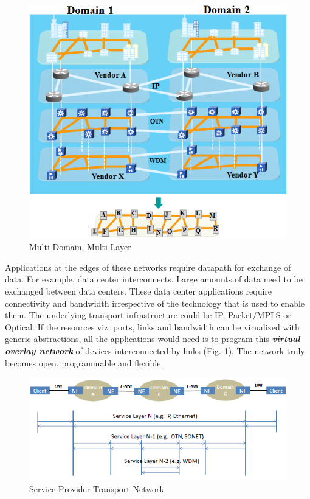 \documentclass{sig-alternate-10pt}
\begin{document}
\begin{figure}[htb]
	\centering
	\includegraphics[scale=0.50]{MultiDomainLayer.png}
	\caption{Multi-Domain, Multi-Layer}
	\label{fig:MDL}
	\end{figure}
	
	Applications at the edges of these networks require datapath for exchange of data. For example, data
	center interconnects. Large amounts of data need to be exchanged between data centers. These data center
	applications require connectivity and bandwidth irrespective of the technology that is used to enable
	them. The underlying transport infrastructure could be IP, Packet/MPLS or Optical. If the resources viz.
	ports, links and bandwidth can be virualized with generic abstractions, all the applications would need
	is to program this \emph{\bf virtual overlay network} of devices interconnected by links (Fig.
	\ref{fig:MDL}). The network truly becomes open, programmable and flexible. \\
		
	\begin{figure}[htb]
	\centering
	\includegraphics[scale=0.50]{MLwoOF.png}
	\caption{Service Provider Transport Network}
	\label{fig:MLwoOF}
	\end{figure}
\end{document}
